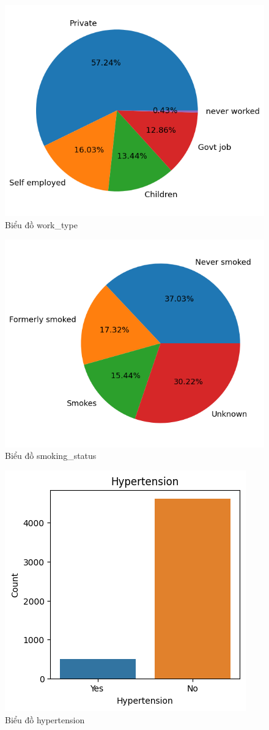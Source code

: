 \documentclass[11pt]{article}
\begin{document}
	\begin{figure}[H]
		\centering
		\includegraphics[width=0.5\linewidth]{workedPie}
		\caption{Biểu đồ work\_type}
		\label{fig:workedpie}
	\end{figure}
	
	\begin{figure}[H]
		\centering
		\includegraphics[width=0.5\linewidth]{smokingPie}
		\caption{Biểu đồ smoking\_status}
		\label{fig:smokingpie}
	\end{figure}
	
	\begin{figure}[H]
		\centering
		\includegraphics[width=0.5\linewidth]{hypertensionChart}
		\caption{Biểu đồ hypertension}
		\label{fig:hypertensionchart}
	\end{figure}
	
\end{document}
